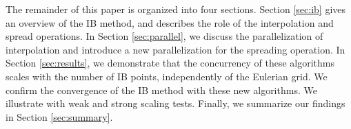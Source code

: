 The remainder of this paper is organized into four sections. Section \ref{sec:ib} gives
an overview of the IB method, and describes the role of the interpolation and spread
operations. In Section \ref{sec:parallel}, we discuss the parallelization of
interpolation and introduce a new parallelization for the spreading operation. In Section
\ref{sec:results}, we demonstrate that the concurrency of these algorithms scales with
the number of IB points, independently of the Eulerian grid. We confirm the convergence
of the IB method with these new algorithms. We illustrate with weak and strong scaling
tests. Finally, we summarize our findings in Section \ref{sec:summary}.

